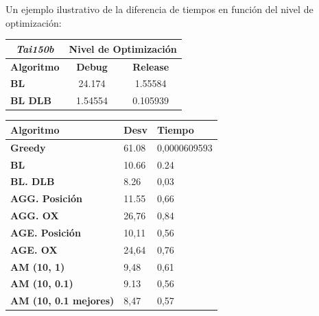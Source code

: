 \documentclass[a4paper, 12pt]{article}
\begin{document}
      Un ejemplo ilustrativo de la diferencia de tiempos en función del nivel de optimización:
      
\begin{table}[H]
\centering
\label{my-label}
\begin{tabular}{l|c|c|}
\cline{2-3}
\multicolumn{1}{c|}{{\textit{Tai150b}}} & \multicolumn{2}{c|}{\textbf{Nivel de Optimización}} \\ \hline
\multicolumn{1}{|c|}{\textbf{Algoritmo}}    & \textbf{Debug}          & \textbf{Release}          \\ \hline
\multicolumn{1}{|l|}{\textbf{BL}}           & 24.174                  & 1.55584                   \\ \hline
\multicolumn{1}{|l|}{\textbf{BL DLB}}       & 1.54554                 & 0.105939                  \\ \hline
\end{tabular}
\end{table}

	\newpage
	\begin{table}[H]
\centering
\label{my-label}
\begin{tabular}{|l|l|l|}
\hline
\textbf{Algoritmo}            & \textbf{Desv} & \textbf{Tiempo} \\ \hline
\textbf{Greedy}               & 61.08         & 0,0000609593    \\ \hline
\textbf{BL}                   & 10.66         & 0.24            \\ \hline
\textbf{BL. DLB}              & 8.26          & 0,03            \\ \hline
\textbf{AGG. Posición}        & 11.55         & 0,66            \\ \hline
\textbf{AGG. OX}              & 26,76         & 0,84            \\ \hline
\textbf{AGE. Posición}        & 10,11         & 0,56            \\ \hline
\textbf{AGE. OX}              & 24,64         & 0,76            \\ \hline
\textbf{AM (10, 1)}           & 9,48          & 0,61            \\ \hline
\textbf{AM (10, 0.1)}         & 9.13          & 0,56            \\ \hline
\textbf{AM (10, 0.1 mejores)} & 8,47          & 0,57            \\ \hline
\end{tabular}
\end{table}
\end{document}
